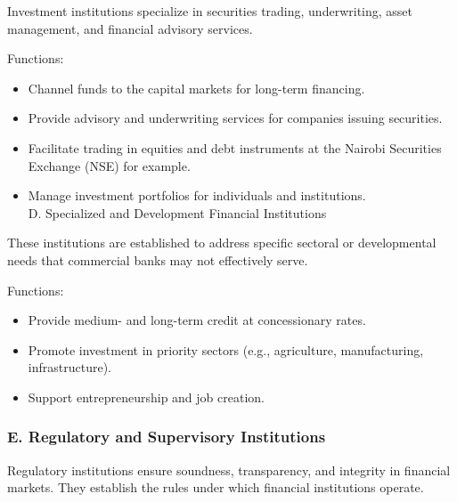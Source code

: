 \documentclass[10pt]{article}
\begin{document}
Investment institutions specialize in securities trading, underwriting, asset management, and financial advisory services.

Functions:

\begin{itemize}
  \item Channel funds to the capital markets for long-term financing.
  \item Provide advisory and underwriting services for companies issuing securities.
  \item Facilitate trading in equities and debt instruments at the Nairobi Securities Exchange (NSE) for example.
  \item Manage investment portfolios for individuals and institutions.\\
D. Specialized and Development Financial Institutions
\end{itemize}

These institutions are established to address specific sectoral or developmental needs that commercial banks may not effectively serve.

Functions:

\begin{itemize}
  \item Provide medium- and long-term credit at concessionary rates.
  \item Promote investment in priority sectors (e.g., agriculture, manufacturing, infrastructure).
  \item Support entrepreneurship and job creation.
\end{itemize}

\subsubsection*{E. Regulatory and Supervisory Institutions}
Regulatory institutions ensure soundness, transparency, and integrity in financial markets. They establish the rules under which financial institutions operate.
\end{document}
